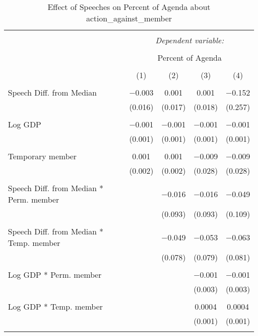 
\begin{table}[!htbp] \centering 
  \caption{Effect of Speeches on Percent of Agenda about  action_against_member} 
  \label{} 
\begin{tabular}{@{\extracolsep{5pt}}lcccc} 
\\[-1.8ex]\hline 
\hline \\[-1.8ex] 
 & \multicolumn{4}{c}{\textit{Dependent variable:}} \\ 
\cline{2-5} 
\\[-1.8ex] & \multicolumn{4}{c}{Percent of Agenda} \\ 
\\[-1.8ex] & (1) & (2) & (3) & (4)\\ 
\hline \\[-1.8ex] 
 Speech Diff. from Median & $-$0.003 & 0.001 & 0.001 & $-$0.152 \\ 
  & (0.016) & (0.017) & (0.018) & (0.257) \\ 
  & & & & \\ 
 Log GDP & $-$0.001 & $-$0.001 & $-$0.001 & $-$0.001 \\ 
  & (0.001) & (0.001) & (0.001) & (0.001) \\ 
  & & & & \\ 
 Temporary member & 0.001 & 0.001 & $-$0.009 & $-$0.009 \\ 
  & (0.002) & (0.002) & (0.028) & (0.028) \\ 
  & & & & \\ 
 Speech Diff. from Median * Perm. member &  & $-$0.016 & $-$0.016 & $-$0.049 \\ 
  &  & (0.093) & (0.093) & (0.109) \\ 
  & & & & \\ 
 Speech Diff. from Median * Temp. member &  & $-$0.049 & $-$0.053 & $-$0.063 \\ 
  &  & (0.078) & (0.079) & (0.081) \\ 
  & & & & \\ 
 Log GDP * Perm. member &  &  & $-$0.001 & $-$0.001 \\ 
  &  &  & (0.003) & (0.003) \\ 
  & & & & \\ 
 Log GDP * Temp. member &  &  & 0.0004 & 0.0004 \\ 
  &  &  & (0.001) & (0.001) \\ 
  & & & & \\ 

\end{tabular}
\end{table}
